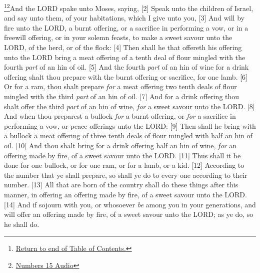 \footnote{\textcolor[cmyk]{0.99998,1,0,0}{\hyperlink{TOC}{Return to end of Table of Contents.}}}\footnote{\href{https://audiobible.com/bible/numbers_15.html}{\textcolor[cmyk]{0.99998,1,0,0}{Numbers 15 Audio}}}\textcolor[cmyk]{0.99998,1,0,0}{And the LORD spake unto Moses, saying,}
[2] \textcolor[cmyk]{0.99998,1,0,0}{Speak unto the children of Israel, and say unto them,  of your habitations, which I give unto you,}
[3] \textcolor[cmyk]{0.99998,1,0,0}{And will  by fire unto the LORD, a burnt offering, or a sacrifice in performing a vow, or in a freewill offering, or in your solemn feasts, to make a sweet savour unto the LORD, of the herd, or of the flock:}
[4] \textcolor[cmyk]{0.99998,1,0,0}{Then shall he that offereth his offering unto the LORD bring a meat offering of a tenth deal of flour mingled with the fourth \emph{part} of an hin of oil.}
[5] \textcolor[cmyk]{0.99998,1,0,0}{And the fourth \emph{part} of an hin of wine for a drink offering shalt thou prepare with the burnt offering or sacrifice, for one lamb.}
[6] \textcolor[cmyk]{0.99998,1,0,0}{Or for a ram, thou shalt prepare \emph{for} a meat offering two tenth deals of flour mingled with the third \emph{part} of an hin of oil.}
[7] \textcolor[cmyk]{0.99998,1,0,0}{And for a drink offering thou shalt offer the third \emph{part} of an hin of wine, \emph{for} a sweet savour unto the LORD.}
[8] \textcolor[cmyk]{0.99998,1,0,0}{And when thou preparest a bullock \emph{for} a burnt offering, or \emph{for} a sacrifice in performing a vow, or peace offerings unto the LORD:}
[9] \textcolor[cmyk]{0.99998,1,0,0}{Then shall he bring with a bullock a meat offering of three tenth deals of flour mingled with half an hin of oil.}
[10] \textcolor[cmyk]{0.99998,1,0,0}{And thou shalt bring for a drink offering half an hin of wine, \emph{for} an offering made by fire, of a sweet savour unto the LORD.}
[11] \textcolor[cmyk]{0.99998,1,0,0}{Thus shall it be done for one bullock, or for one ram, or for a lamb, or a kid.}
[12] \textcolor[cmyk]{0.99998,1,0,0}{According to the number that ye shall prepare, so shall ye do to every one according to their number.}
[13] \textcolor[cmyk]{0.99998,1,0,0}{All that are born of the country shall do these things after this manner, in offering an offering made by fire, of a sweet savour unto the LORD.}
[14] \textcolor[cmyk]{0.99998,1,0,0}{And if  sojourn with you, or whosoever \emph{be} among you in your generations, and will offer an offering made by fire, of a sweet savour unto the LORD; as ye do, so he shall do.}
